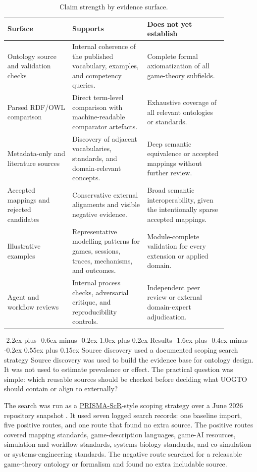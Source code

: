 \documentclass[11pt]{article}
\makeatletter
\renewcommand\section{\@startsection{section}{1}{\z@}%
  {-2.2ex plus -0.6ex minus -0.2ex}%
  {1.0ex plus 0.2ex}%
  {\normalfont\Large\bfseries\color{uogtoInk}}}
\renewcommand\subsection{\@startsection{subsection}{2}{\z@}%
  {-1.6ex plus -0.4ex minus -0.2ex}%
  {0.55ex plus 0.15ex}%
  {\normalfont\large\bfseries\color{uogtoInk}}}
\newcommand{\abblink}[2]{\hyperlink{abbr:#1}{#2}}
\makeatother
\begin{document}
\begin{table}[ht]
\centering
\caption{Claim strength by evidence surface.}
\label{tab:evidence-strength}
\begin{tabular}{p{0.26\linewidth}p{0.30\linewidth}p{0.32\linewidth}}
\toprule
Surface & Supports & Does not yet establish \\
\midrule
Ontology source and validation checks & Internal coherence of the published vocabulary, examples, and competency queries. & Complete formal axiomatization of all game-theory subfields. \\
Parsed RDF/OWL comparison & Direct term-level comparison with machine-readable comparator artefacts. & Exhaustive coverage of all relevant ontologies or standards. \\
Metadata-only and literature sources & Discovery of adjacent vocabularies, standards, and domain-relevant concepts. & Deep semantic equivalence or accepted mappings without further review. \\
Accepted mappings and rejected candidates & Conservative external alignments and visible negative evidence. & Broad semantic interoperability, given the intentionally sparse accepted mappings. \\
Illustrative examples & Representative modelling patterns for games, sessions, traces, mechanisms, and outcomes. & Module-complete validation for every extension or applied domain. \\
Agent and workflow reviews & Internal process checks, adversarial critique, and reproducibility controls. & Independent peer review or external domain-expert adjudication. \\
\bottomrule
\end{tabular}
\end{table}

\section{Results}
\subsection{Source discovery used a documented scoping search strategy}
Source discovery was used to build the evidence base for ontology design. It was not used to estimate prevalence or effect. The practical question was simple: which reusable sources should be checked before deciding what UOGTO should contain or align to externally?

The search was run as a \abblink{prismascr}{PRISMA-ScR}-style scoping strategy over a June 2026 repository snapshot \cite{prisma-scr-2018}. It used seven logged search records: one baseline import, five positive routes, and one route that found no extra source. The positive routes covered mapping standards, game-description languages, game-AI resources, simulation and workflow standards, systems-biology standards, and co-simulation or systems-engineering standards. The negative route searched for a releasable game-theory ontology or formalism and found no extra includable source.
\end{document}
